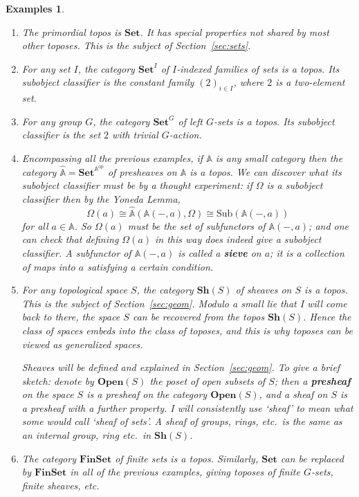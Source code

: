 \documentclass[12pt]{article}
\newcommand{\dashbk}{-}
\newcommand{\fcat}[1]{\mathbf{#1}}
\newcommand{\op}{\mathrm{op}}
\newcommand{\Set}{\fcat{Set}}
\newcommand{\demph}[1]{\textbf{\textup{#1}}}
\newcommand{\scat}[1]{\mathbb{#1}}
\newcommand{\iso}{\cong}
\newcommand{\Sub}{\mathrm{Sub}}
\newcommand{\Psh}[1]{\widehat{#1}}
\newcommand{\Sh}{\fcat{Sh}}
\newcommand{\Open}{\fcat{Open}}
\newcommand{\FinSet}{\fcat{FinSet}}
\newtheorem{preexamples}[thm]{Examples}
\newenvironment{examples}{\begin{preexamples}\upshape}{\end{preexamples}}
\begin{document}
\begin{examples}        \label{egs:toposes}
\begin{enumerate}
\item  
The primordial topos is $\Set$.  It has special properties not shared by most
other toposes.  This is the subject of Section~\ref{sec:sets}.

\item 
For any set $I$, the category $\Set^I$ of $I$-indexed families of sets is a
topos.  Its subobject classifier is the constant family $(2)_{i \in I}$, where
$2$ is a two-element set.

\item 
For any group $G$, the category $\Set^G$ of left $G$-sets is a topos.  Its
subobject classifier is the set $2$ with trivial $G$-action.

\item   \label{eg:topos-pshf}
Encompassing all the previous examples, if $\scat{A}$ is any small category
then the category $\Psh{\scat{A}} = \Set^{\scat{A}^\op}$ of presheaves on
$\scat{A}$ is a topos.  We can discover what its subobject classifier must be
by a thought experiment: \emph{if} $\Omega$ is a subobject classifier then by
the Yoneda Lemma,
\[
\Omega(a) 
\iso
\Psh{\scat{A}}( \scat{A}(\dashbk, a), \Omega )
\iso
\Sub(\scat{A}(\dashbk, a))
\]
for all $a \in \scat{A}$.  So $\Omega(a)$ must be the set of subfunctors of
$\scat{A}(\dashbk, a)$; and one can check that defining $\Omega(a)$ in this
way does indeed give a subobject classifier.  A subfunctor of
$\scat{A}(\dashbk, a)$ is called a \demph{sieve} on $a$; it is a collection of
maps into $a$ satisfying a certain condition. 

\item For any topological space $S$, the category $\Sh(S)$ of sheaves on $S$
is a topos.  This is the subject of Section~\ref{sec:geom}.  Modulo a small
lie that I will come back to there, the space $S$ can be recovered from the
topos $\Sh(S)$.  Hence the class of spaces embeds into the class of toposes,
and this is why toposes can be viewed as generalized spaces.

Sheaves will be defined and explained in Section~\ref{sec:geom}.  To give a
brief sketch: denote by $\Open(S)$ the poset of open subsets of $S$; then a
\demph{presheaf} on the space $S$ is a presheaf on the category $\Open(S)$,
and a sheaf on $S$ is a presheaf with a further property.  I will
consistently use `sheaf' to mean what some would call `sheaf of sets'.  A
sheaf of groups, rings, etc.\ is the same as an internal group, ring etc.\ in
$\Sh(S)$.  

\item
The category $\FinSet$ of finite sets is a topos.  Similarly, $\Set$ can be
replaced by $\FinSet$ in all of the previous examples, giving toposes of
finite $G$-sets, finite sheaves, etc.  
\end{enumerate}
\end{examples}
\end{document}
